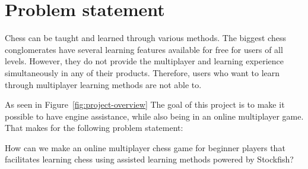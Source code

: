 \chapter{Problem statement}\label{ch:problem-statement}

Chess can be taught and learned through various methods.
The biggest chess conglomerates have several learning features available for free for users of all levels.
However, they do not provide the multiplayer and learning experience simultaneously in any of their products.
Therefore, users who want to learn through multiplayer learning methods are not able to.

As seen in Figure~\ref{fig:project-overview} The goal of this project is to make it possible to have engine
assistance, while also being in an online multiplayer game.
That makes for the following problem statement:

\begin{tcolorbox}
    How can we make an online multiplayer chess game for beginner players that facilitates learning chess using
    assisted learning methods powered by Stockfish?
\end{tcolorbox}
